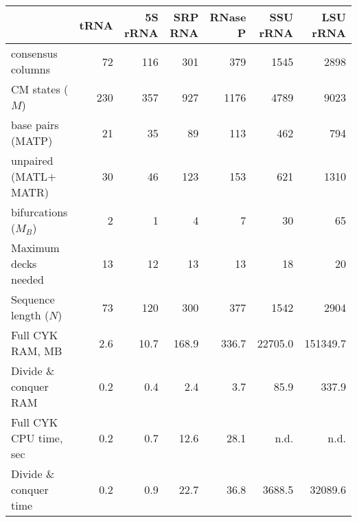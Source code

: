 \documentclass[11pt]{article}
\begin{document}
\begin{tabular}{lrrrrrr}
                      & tRNA  & 5S rRNA  & SRP RNA & RNase P & SSU rRNA & LSU rRNA \\\hline
consensus columns     &   72  &    116   &    301  &    379  &   1545   &    2898\\
CM states ($M$)       &  230  &    357   &    927  &   1176  &   4789   &    9023\\
base pairs (MATP)     &   21  &     35   &     89  &    113  &    462   &     794\\
unpaired (MATL$+$MATR)&   30  &     46   &    123  &    153  &    621   &    1310\\
bifurcations ($M_B$)  &    2  &      1   &      4  &      7  &     30   &      65\\
Maximum decks needed  &   13  &     12   &     13  &     13  &     18   &      20\\
Sequence length ($N$) &   73  &    120   &    300  &    377  &   1542   &    2904\\
Full CYK RAM, MB      &  2.6  &   10.7   &  168.9  &  336.7  &22705.0   &151349.7\\
Divide \& conquer RAM &  0.2  &    0.4   &    2.4  &    3.7  &   85.9   &   337.9\\
Full CYK CPU time, sec&  0.2  &    0.7   &   12.6  &   28.1  &    n.d.  &    n.d.\\
Divide \& conquer time&  0.2  &    0.9   &   22.7  &   36.8  & 3688.5   & 32089.6\\\hline
\end{tabular}




\end{document}
